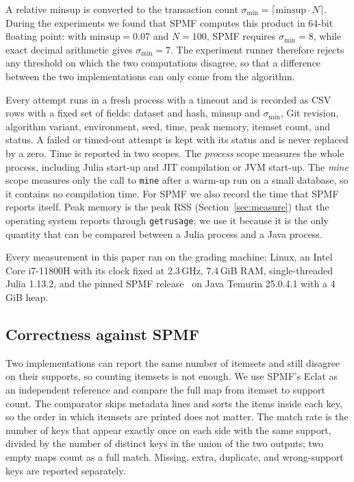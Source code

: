 A relative minsup is converted to the transaction count
$\sigma_{\min} = \lceil \mathrm{minsup} \cdot N \rceil$. During the experiments we found
that SPMF computes this product in 64-bit floating point: with $\mathrm{minsup} = 0.07$
and $N = 100$, SPMF requires $\sigma_{\min} = 8$, while exact decimal arithmetic gives
$\sigma_{\min} = 7$. The experiment runner therefore rejects any threshold on which the two
computations disagree, so that a difference between the two implementations can only come
from the algorithm.

Every attempt runs in a fresh process with a timeout and is recorded as CSV rows with a
fixed set of fields: dataset and hash, minsup and $\sigma_{\min}$, Git revision, algorithm
variant, environment, seed, time, peak memory, itemset count, and status. A failed or
timed-out attempt is kept with its status and is never replaced by a zero. Time is
reported in two scopes. The \emph{process} scope measures the whole process, including
Julia start-up and JIT compilation or JVM start-up. The \emph{mine} scope measures only the
call to \texttt{mine} after a warm-up run on a small database, so it contains no
compilation time. For SPMF we also record the time that SPMF reports itself. Peak memory
is the peak RSS (Section~\ref{sec:measure}) that the operating system reports through
\texttt{getrusage}; we use it because it is the only quantity that can be compared between
a Julia process and a Java process.

Every measurement in this paper ran on the grading machine: Linux, an Intel Core
i7-11800H with its clock fixed at 2.3\,GHz, 7.4\,GiB RAM, single-threaded Julia 1.13.2,
and the pinned SPMF release~\cite{spmf2016} on Java Temurin 25.0.4.1 with a 4\,GiB heap.

\subsection{Correctness against SPMF}
\label{sec:exact}
Two implementations can report the same number of itemsets and still disagree on their
supports, so counting itemsets is not enough. We use SPMF's Eclat as an independent
reference and compare the full map from itemset to support count. The comparator skips
metadata lines and sorts the items inside each key, so the order in which itemsets are
printed does not matter. The match rate is the number of keys that appear exactly once on
each side with the same support, divided by the number of distinct keys in the union of
the two outputs; two empty maps count as a full match. Missing, extra, duplicate, and
wrong-support keys are reported separately.


